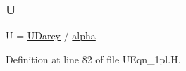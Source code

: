 \mbox{\label{UEqn__1pl_8H_a81cf6107131a3583e2b0b762cb9c2862}} 
\subsubsection{\texorpdfstring{U}{U}}
{\footnotesize\ttfamily U = \hyperlink{UEqn__1pl_8H_a128902f421bd168fd4996f177e0a59ad}{U\+Darcy} / \hyperlink{UEqn__1pl_8H_a7fe02434a19f3e00e927f32adcbb193b}{alpha}}



Definition at line 82 of file U\+Eqn\+\_\+1pl.\+H.


